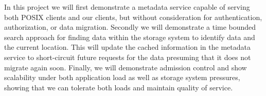 In this project we will first 
%
demonstrate a metadata service capable of serving both POSIX
clients and our clients, but without consideration for authentication,
authorization, or data migration.
Secondly we will 
demonstrate a time bounded search approach for finding data
within the storage system to identify data and the current location.  This will
update the cached information in the metadata service to short-circuit future
requests for the data presuming that it does not migrate again soon.
Finally, we will 
demonstrate admission control and show scalability under
both application load as well as storage system pressures, showing that we can
tolerate both loads and maintain quality of service.



